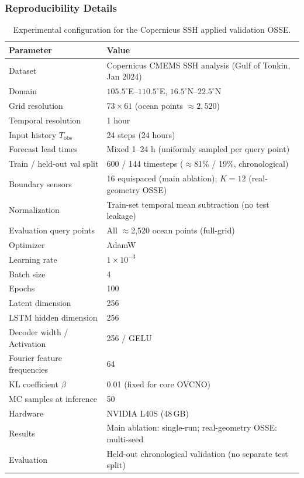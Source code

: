 \documentclass[11pt,a4paper]{article}
\begin{document}
\subsubsection{Reproducibility Details}

\begin{table}[!htbp]
\centering
\caption{Experimental configuration for the Copernicus SSH applied validation OSSE.}
\label{tab:reproducibility}
\vspace{4pt}
\small
\begin{tabular}{@{}l l@{}}
\toprule
\textbf{Parameter} & \textbf{Value} \\
\midrule
Dataset & Copernicus CMEMS SSH analysis (Gulf of Tonkin, Jan 2024) \\
Domain & $105.5^\circ$E--$110.5^\circ$E, $16.5^\circ$N--$22.5^\circ$N \\
Grid resolution & $73 \times 61$ (ocean points $\approx 2{,}520$) \\
Temporal resolution & 1 hour \\
Input history $T_{\mathrm{obs}}$ & 24 steps (24 hours) \\
Forecast lead times & Mixed 1--24 h (uniformly sampled per query point) \\
Train / held-out val split & 600 / 144 timesteps ($\approx$81\% / 19\%, chronological) \\
\midrule
Boundary sensors & 16 equispaced (main ablation); $K{=}12$ (real-geometry OSSE) \\
Normalization & Train-set temporal mean subtraction (no test leakage) \\
Evaluation query points & All $\approx$2{,}520 ocean points (full-grid) \\
\midrule
Optimizer & AdamW~\cite{loshchilov2019adamw} \\
Learning rate & $1 \times 10^{-3}$ \\
Batch size & 4 \\
Epochs & 100 \\
Latent dimension & 256 \\
LSTM hidden dimension & 256 \\
Decoder width / Activation & 256 / GELU~\cite{hendrycks2016gelu} \\
Fourier feature frequencies & 64 \\
KL coefficient $\beta$ & 0.01 (fixed for core OVCNO) \\
MC samples at inference & 50 \\
Hardware & NVIDIA L40S (48\,GB) \\
Results & Main ablation: single-run; real-geometry OSSE: multi-seed \\
Evaluation & Held-out chronological validation (no separate test split) \\
\bottomrule
\end{tabular}
\end{table}
\end{document}
